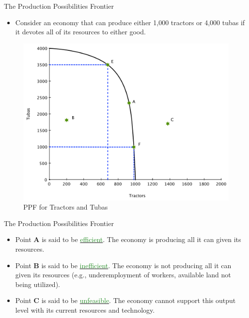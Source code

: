 \documentclass[xcolor={dvipsnames},pdf, hyperref={colorlinks=true, citecolor=ForestGreen, linkcolor=BlueViolet, urlcolor=Magenta}]{beamer}
\newcommand{\dd}[1]{{\underline{\textcolor{ForestGreen}{#1}}}}
\begin{document}
\begin{frame}{The Production Possibilities Frontier}
	\begin{itemize}
	\item	Consider an economy that can produce either 1,000 tractors or 4,000 tubas if it devotes all of its resources to either good.
	\end{itemize}		
			\begin{figure}[H]
				\centering
				\includegraphics[scale=.3]{plot1.pdf}
				\caption{PPF for Tractors and Tubas}
				\label{ppf1}
			\end{figure}
\end{frame}


\begin{frame}{The Production Possibilities Frontier}
	\begin{itemize}
		\item 	Point \textbf{A} is said to be \dd{efficient}. 
		The economy is producing all it can given its resources.
		
		\item Point \textbf{B} is said to be \dd{inefficient}. 
		The economy is not producing all it can given its resources (e.g., underemployment of workers, available land not being utilized).
		
		\item Point \textbf{C} is said to be \dd{unfeasible}. The economy cannot support this output level with its current resources and technology.
	\end{itemize}
\end{frame}
\end{document}
